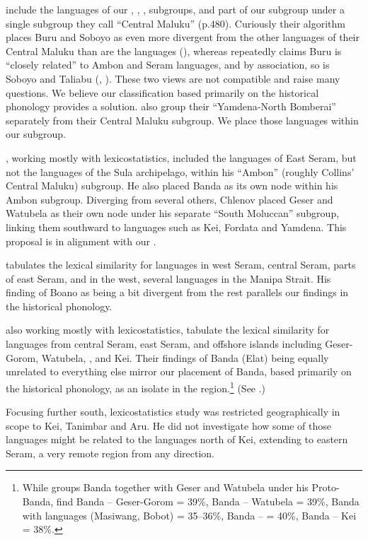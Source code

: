 \citet{GrayGreenhill2009} include the languages of our ,
, ,  subgroups, and
part of our  subgroup under a single
subgroup they call “Central Maluku” (p.480).
Curiously their algorithm places Buru
and Soboyo as even more divergent from the other languages of
their Central Maluku than are the  languages (),
whereas \citet{Collins1981,Collins1983} repeatedly claims Buru is “closely
related” to Ambon and Seram languages, and by association,
so is Soboyo and Taliabu
(\citeyear[15, 19--20]{Collins1983}, \citeyear[86, footnote 1]{Collins1989}).
These two views are not compatible
and raise many questions.
We believe our classification based primarily on the historical
phonology provides a solution. \citet{GrayGreenhill2009}
also group their “Yamdena-North Bomberai” separately from
their Central Maluku subgroup.
We place those languages within our  subgroup.

\citet{Chlenov1976}, working mostly with lexicostatistics,
included the languages of East Seram,
but not the languages of the Sula archipelago,
within his “Ambon” (roughly Collins’ Central Maluku) subgroup.
He also placed Banda as its own node within his Ambon subgroup.
Diverging from several others,
Chlenov placed Geser and Watubela as their own node under his
separate “South Moluccan” subgroup,
linking them southward to languages such as Kei, Fordata and Yamdena.
This proposal is in alignment with our .

\citet{Taguchi1989} tabulates the lexical similarity for languages
in west Seram, central Seram, parts of east Seram,
and in the west,
several languages in the Manipa Strait.
His finding of Boano as being a bit divergent from the rest parallels
our findings in the historical phonology.

\citet{LoskiLoski1989} also working mostly with lexicostatistics,
tabulate the lexical similarity for languages from central Seram,
east Seram, and offshore islands including Geser-Gorom,
Watubela, , and Kei.
Their findings \citeyear[112]{LoskiLoski1989} of Banda (Elat) being equally
unrelated to everything else mirror our placement of Banda,
based primarily on the historical phonology,
as an isolate in the region.\footnote{\label{fn:BandaLexicalSimilarity}
		While \citet{Collins1986}
		groups Banda together with Geser
		and Watubela under his Proto-Banda,
		\citet[112]{LoskiLoski1989} find Banda -- Geser-Gorom =
		39{\%}, Banda -- Watubela = 39{\%},
		Banda with  languages (Masiwang,
		Bobot) = 35--36{\%}, Banda --  = 40{\%},
		Banda -- Kei = 38{\%}.}
(See .)

Focusing further south, \citet{Hughes1987} lexicostatistics study
was restricted geographically in scope to Kei, Tanimbar and Aru.
He did not investigate how some of those languages might be related
to the languages north of Kei,
extending to eastern Seram,
a very remote region from any direction.